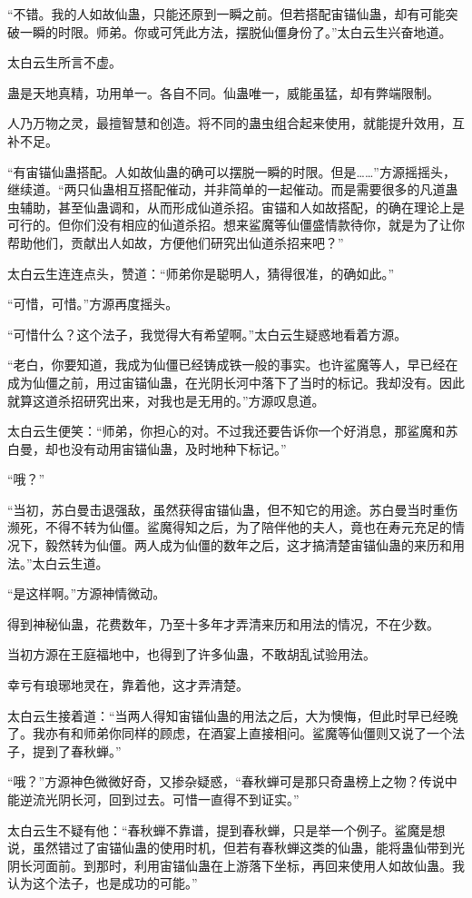 \begin{this_body}
“不错。我的人如故仙蛊，只能还原到一瞬之前。但若搭配宙锚仙蛊，却有可能突破一瞬的时限。师弟。你或可凭此方法，摆脱仙僵身份了。”太白云生兴奋地道。

太白云生所言不虚。

蛊是天地真精，功用单一。各自不同。仙蛊唯一，威能虽猛，却有弊端限制。

人乃万物之灵，最擅智慧和创造。将不同的蛊虫组合起来使用，就能提升效用，互补不足。

“有宙锚仙蛊搭配。人如故仙蛊的确可以摆脱一瞬的时限。但是……”方源摇摇头，继续道。“两只仙蛊相互搭配催动，并非简单的一起催动。而是需要很多的凡道蛊虫辅助，甚至仙蛊调和，从而形成仙道杀招。宙锚和人如故搭配，的确在理论上是可行的。但你们没有相应的仙道杀招。想来鲨魔等仙僵盛情款待你，就是为了让你帮助他们，贡献出人如故，方便他们研究出仙道杀招来吧？”

太白云生连连点头，赞道：“师弟你是聪明人，猜得很准，的确如此。”

“可惜，可惜。”方源再度摇头。

“可惜什么？这个法子，我觉得大有希望啊。”太白云生疑惑地看着方源。

“老白，你要知道，我成为仙僵已经铸成铁一般的事实。也许鲨魔等人，早已经在成为仙僵之前，用过宙锚仙蛊，在光阴长河中落下了当时的标记。我却没有。因此就算这道杀招研究出来，对我也是无用的。”方源叹息道。

太白云生便笑：“师弟，你担心的对。不过我还要告诉你一个好消息，那鲨魔和苏白曼，却也没有动用宙锚仙蛊，及时地种下标记。”

“哦？”

“当初，苏白曼击退强敌，虽然获得宙锚仙蛊，但不知它的用途。苏白曼当时重伤濒死，不得不转为仙僵。鲨魔得知之后，为了陪伴他的夫人，竟也在寿元充足的情况下，毅然转为仙僵。两人成为仙僵的数年之后，这才搞清楚宙锚仙蛊的来历和用法。”太白云生道。

“是这样啊。”方源神情微动。

得到神秘仙蛊，花费数年，乃至十多年才弄清来历和用法的情况，不在少数。

当初方源在王庭福地中，也得到了许多仙蛊，不敢胡乱试验用法。

幸亏有琅琊地灵在，靠着他，这才弄清楚。

太白云生接着道：“当两人得知宙锚仙蛊的用法之后，大为懊悔，但此时早已经晚了。我亦有和师弟你同样的顾虑，在酒宴上直接相问。鲨魔等仙僵则又说了一个法子，提到了春秋蝉。”

“哦？”方源神色微微好奇，又掺杂疑惑，“春秋蝉可是那只奇蛊榜上之物？传说中能逆流光阴长河，回到过去。可惜一直得不到证实。”

太白云生不疑有他：“春秋蝉不靠谱，提到春秋蝉，只是举一个例子。鲨魔是想说，虽然错过了宙锚仙蛊的使用时机，但若有春秋蝉这类的仙蛊，能将蛊仙带到光阴长河面前。到那时，利用宙锚仙蛊在上游落下坐标，再回来使用人如故仙蛊。我认为这个法子，也是成功的可能。”


\end{this_body}
